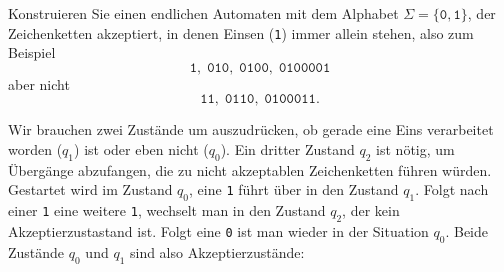 Konstruieren Sie einen endlichen Automaten mit dem Alphabet
$\Sigma=\{\texttt{0},\texttt{1}\}$, der Zeichenketten akzeptiert, in denen
Einsen (\texttt{1}) immer allein stehen, also zum Beispiel
\[
\texttt{1},\;
\texttt{010},\;
\texttt{0100},\;
\texttt{0100001}
\]
aber nicht
\[
\texttt{11},\;
\texttt{0110},\;
\texttt{0100011}.
\]


\begin{loesung}
Wir brauchen zwei Zustände um auszudrücken, ob gerade eine Eins verarbeitet
worden ($q_1$) ist oder eben nicht ($q_0$).
Ein dritter Zustand $q_2$ ist nötig, um Übergänge abzufangen, die zu nicht
akzeptablen Zeichenketten führen würden.
Gestartet wird im Zustand $q_0$, eine \texttt{1} führt über in den 
Zustand $q_1$.
Folgt nach einer \texttt{1} eine weitere \texttt{1}, wechselt man
in den Zustand $q_2$, der kein Akzeptierzustastand ist.
Folgt eine \texttt{0} ist man wieder in der Situation $q_0$.
Beide Zustände $q_0$ und $q_1$ sind also Akzeptierzustände:
\begin{center}
\def\zustand#1#2{
	\fill[color=white] #1 circle[radius=0.5];
	\node at #1 {$#2$};
	\draw #1 circle[radius=0.5];
}
\def\akzeptierzustand#1#2{
	\fill[color=white] #1 circle[radius=0.5];
	\node at #1 {$#2$};
	\draw #1 circle[radius=0.5];
	\draw #1 circle[radius=0.45];
}
\def\pfeil#1#2#3{
	\draw[->,shorten >= 0.5cm,shorten <= 0.5cm] #1 -- #2;
	\node at ($0.5*#1+0.5*#2$) [above] {$#3$};
}
\end{center}
\end{loesung}

